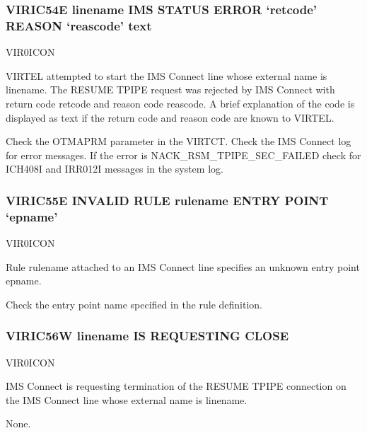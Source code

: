 \documentclass[letterpaper,10pt,english]{sphinxmanual}
\begin{document}
\subsubsection{VIRIC54E linename IMS STATUS ERROR ‘retcode’ REASON ‘reascode’ text}
\label{\detokenize{messages:viric54e-linename-ims-status-error-retcode-reason-reascode-text}}\begin{description}
\sphinxAtStartPar
VIR0ICON

\sphinxAtStartPar
VIRTEL attempted to start the IMS Connect line whose external name is linename. The RESUME TPIPE request was rejected by IMS Connect with return code retcode and reason code reascode. A brief explanation of the code is displayed as text if the return code and reason code are known to VIRTEL.

\sphinxAtStartPar
Check the OTMAPRM parameter in the VIRTCT. Check the IMS Connect log for error messages. If the error is NACK\_RSM\_TPIPE\_SEC\_FAILED check for ICH408I and IRR012I messages in the system log.

\end{description}


\subsubsection{VIRIC55E INVALID RULE rulename ENTRY POINT ‘epname’}
\label{\detokenize{messages:viric55e-invalid-rule-rulename-entry-point-epname}}\begin{description}
\sphinxAtStartPar
VIR0ICON

\sphinxAtStartPar
Rule rulename attached to an IMS Connect line specifies an unknown entry point epname.

\sphinxAtStartPar
Check the entry point name specified in the rule definition.

\end{description}


\subsubsection{VIRIC56W linename IS REQUESTING CLOSE}
\label{\detokenize{messages:viric56w-linename-is-requesting-close}}\begin{description}
\sphinxAtStartPar
VIR0ICON

\sphinxAtStartPar
IMS Connect is requesting termination of the RESUME TPIPE connection on the IMS Connect line whose external name is linename.

\sphinxAtStartPar
None.

\end{description}
\end{document}
